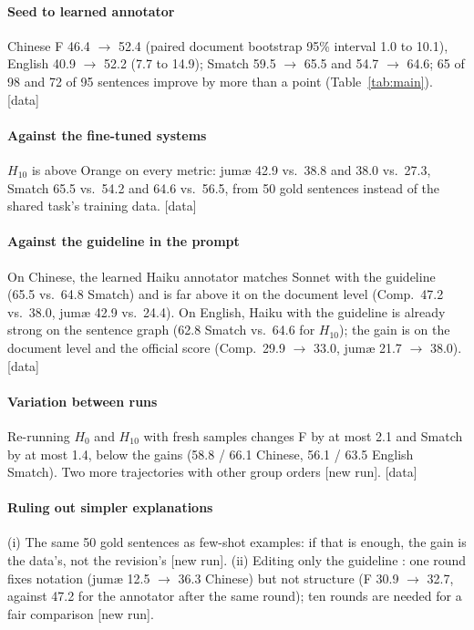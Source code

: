 \documentclass[11pt]{article}
\newcommand{\jumach}{ju\textlengthmark{}m\ae{}\textteshlig{}\xspace}
\newcommand{\stag}[2]{\textcolor{#1}{\textsf{\scriptsize[#2]}}}
\newcommand{\HAVE}{\stag{green!50!black}{data}\xspace}
\newcommand{\RUN}{\stag{red!75!black}{new run}\xspace}
\begin{document}
\paragraph{Seed to learned annotator}
Chinese F 46.4 $\rightarrow$ 52.4 (paired document bootstrap 95\% interval 1.0 to 10.1), English 40.9 $\rightarrow$ 52.2 (7.7 to 14.9); Smatch 59.5 $\rightarrow$ 65.5 and 54.7 $\rightarrow$ 64.6; 65 of 98 and 72 of 95 sentences improve by more than a point (Table~\ref{tab:main}). \HAVE

\paragraph{Against the fine-tuned systems}
$H_{10}$ is above Orange on every metric: \jumach 42.9 vs.\ 38.8 and 38.0 vs.\ 27.3, Smatch 65.5 vs.\ 54.2 and 64.6 vs.\ 56.5, from 50 gold sentences instead of the shared task's training data. \HAVE

\paragraph{Against the guideline in the prompt}
On Chinese, the learned Haiku annotator matches Sonnet with the guideline (65.5 vs.\ 64.8 Smatch) and is far above it on the document level (Comp.\ 47.2 vs.\ 38.0, \jumach 42.9 vs.\ 24.4). On English, Haiku with the guideline is already strong on the sentence graph (62.8 Smatch vs.\ 64.6 for $H_{10}$); the gain is on the document level and the official score (Comp.\ 29.9 $\rightarrow$ 33.0, \jumach 21.7 $\rightarrow$ 38.0). \HAVE

\paragraph{Variation between runs}
Re-running $H_0$ and $H_{10}$ with fresh samples changes F by at most 2.1 and Smatch by at most 1.4, below the gains (58.8 / 66.1 Chinese, 56.1 / 63.5 English Smatch). Two more trajectories with other group orders \RUN. \HAVE

\paragraph{Ruling out simpler explanations}
(i) The same 50 gold sentences as few-shot examples: if that is enough, the gain is the data's, not the revision's \RUN. (ii) Editing only the guideline \citep{kim2026refining}: one round fixes notation (\jumach 12.5 $\rightarrow$ 36.3 Chinese) but not structure (F 30.9 $\rightarrow$ 32.7, against 47.2 for the annotator after the same round); ten rounds are needed for a fair comparison \RUN.
\end{document}
